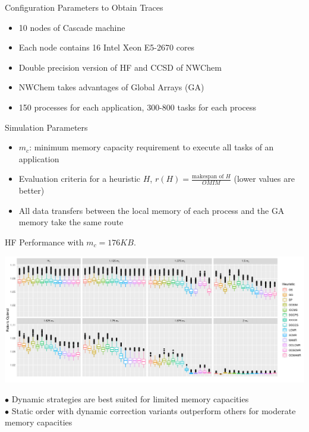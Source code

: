 \documentclass[mathserif,hyperref={pdfpagemode=FullScreen}]{beamer}
\begin{document}
\begin{frame}{Configuration Parameters to Obtain Traces}
\begin{itemize}
	\item 10 nodes of Cascade machine
	\item Each node contains 16 Intel Xeon E5-2670 cores
	\item Double precision version of  HF and CCSD of NWChem
	\item NWChem takes advantages of Global Arrays (GA) 
	\item 150 processes for each application,  300-800 tasks for each process

\end{itemize}

\begin{block}{Simulation Parameters}
\begin{itemize}
	\item $m_c$: minimum memory capacity requirement to execute all tasks of an application
	\item Evaluation criteria for a heuristic $H$, $r(H)=\frac{\text{makespan of $H$}}{OMIM}$ (lower values are better)
	\item All data transfers between the local memory of each process and the GA memory take the same route
\end{itemize}
\end{block}
\end{frame}


\begin{frame}{HF Performance with $m_c=176KB$.}
\begin{center}
\includegraphics[width=1.05\linewidth]{./diagrams/results/ratio_to_optimal_selected_hf.pdf}
\end{center}
$\bullet$ Dynamic strategies are best suited for limited memory capacities\\
$\bullet$ Static order with dynamic correction variants outperform others for moderate memory capacities
\end{frame}
\end{document}
